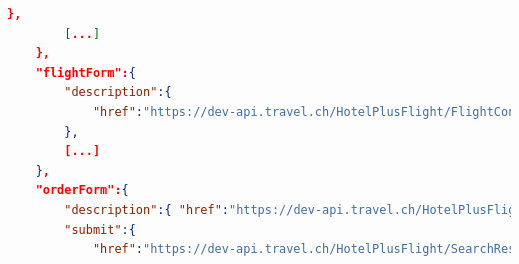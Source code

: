 \begin{lstlisting}[language=json,firstnumber=1]
        },
        [...]
    },
    "flightForm":{
        "description":{
            "href":"https://dev-api.travel.ch/HotelPlusFlight/FlightConfigurationFormDescription?offerHotelInformation=https%3A%2F%2Fdev-api.travel.ch%2FHotelInformation%2F46FFEA61-6A24-4FCB-AE6A-524CE6E752DF&roomOccupancies%5B0%5D.dateOfBirths%5B0%5D=null&roomOccupancies%5B0%5D.dateOfBirths%5B1%5D=null&departureAirports%5B0%5D=https%3A%2F%2Fdev-api.travel.ch%2FDestination%2FA6299722&rooms%5B0%5D.HubBookingCode=DB-3D&flights%5B0%5D.HubId=2H&flights%5B1%5D.HubId=1I&flights%5B0%5D.HubCode=ZRHTXL&flights%5B1%5D.HubCode=TXLZRH&periodOfStay.checkInDate=2016-10-05&periodOfStay.checkOutDate=2016-10-12"
        },
        [...]
    },
    "orderForm":{
        "description":{ "href":"https://dev-api.travel.ch/HotelPlusFlight/OrderFormDescription" },
        "submit":{
            "href":"https://dev-api.travel.ch/HotelPlusFlight/SearchResult/Offer/Order?destination=https%3A%2F%2Fdev-api.travel.ch%2FDestination%2FH_9675C54E32056B7DC2393EE1D758FEB9&offerHotelInformation=https%3A%2F%2Fdev-api.travel.ch%2FHotelInformation%2F46FFEA61-6A24-4FCB-AE6A-524CE6E752DF&hotelInformation=https%3A%2F%2Fdev-api.travel.ch%2FHotelInformation%2F46FFEA61-6A24-4FCB-AE6A-524CE6E752DF&periodOfStay.checkInDate=2016-10-05&periodOfStay.checkOutDate=2016-10-12&roomOccupancies%5B0%5D.dateOfBirths%5B0%5D=null&roomOccupancies%5B0%5D.dateOfBirths%5B1%5D=null&departureAirports%5B0%5D=https%3A%2F%2Fdev-api.travel.ch%2FDestination%2FA6299722&mealTypeCategories%5B0%5D=https%3A%2F%2Fdev-api.travel.ch%2FHotelMealTypeCategory%2FRoomOnly&mealTypeCategories%5B1%5D=https%3A%2F%2Fdev-api.travel.ch%2FHotelMealTypeCategory%2FBreakfast&mealTypeCategories%5B2%5D=https%3A%2F%2Fdev-api.travel.ch%2FHotelMealTypeCategory%2FHalfBoard&mealTypeCategories%5B3%5D=https%3A%2F%2Fdev-api.travel.ch%2FHotelMealTypeCategory%2FFullBoard&mealTypeCategories%5B4%5D=https%3A%2F%2Fdev-api.travel.ch%2FHotelMealTypeCategory%2FAllInclusive&tourOperators%5B0%5D=https%3A%2F%2Fdev-api.travel.ch%2FTourOperator%2FTWCH&tourOperators%5B1%5D=https%3A%2F%2Fdev-api.travel.ch%2FTourOperator%2FTOC&roomTypeCategories%5B0%5D=https%3A%2F%2Fdev-api.travel.ch%2FHotelRoomTypeCategory%2FHotelRoom&roomTypeCategories%5B1%5D=https%3A%2F%2Fdev-api.travel.ch%2FHotelRoomTypeCategory%2FStudio&roomTypeCategories%5B2%5D=https%3A%2F%2Fdev-api.travel.ch%2FHotelRoomTypeCategory%2FJuniorSuite&roomTypeCategories%5B3%5D=https%3A%2F%2Fdev-api.travel.ch%2FHotelRoomTypeCategory%2FApartment&roomTypeCategories%5B4%5D=https%3A%2F%2Fdev-api.travel.ch%2FHotelRoomTypeCategory%2FSuite&roomTypeCategories%5B5%5D=https%3A%2F%2Fdev-api.travel.ch%2FHotelRoomTypeCategory%2FBungalow&rooms%5B0%5D.HubBookingCode=DB-3D&flights%5B0%5D.HubId=2H&flights%5B1%5D.HubId=1I&flights%5B0%5D.HubCode=ZRHTXL&flights%5B1%5D.HubCode=TXLZRH",

\end{lstlisting}
